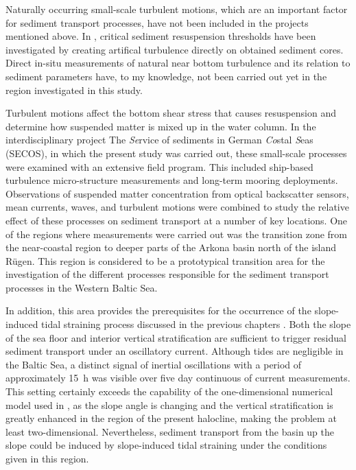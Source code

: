 Naturally occurring small-scale turbulent motions, which are an important 
factor for sediment transport processes, have not been included in the projects 
mentioned above. In \cite{basys1}, critical sediment resuspension thresholds 
have been investigated by creating artifical turbulence directly on 
obtained sediment cores. Direct in-situ measurements of natural near bottom 
turbulence and its relation to sediment parameters have, to my knowledge, not 
been carried out yet in the region investigated in this study. 

Turbulent motions affect the bottom 
shear stress that causes resuspension and determine how 
suspended matter is mixed up in the water column. In the interdisciplinary 
project The \textit{Se}rvice of sediments in German \textit{Co}stal 
\textit{S}eas (SECOS), in which the present study was carried out, these 
small-scale processes were examined with an extensive field program. This 
included ship-based turbulence micro-structure measurements and long-term 
mooring 
deployments. Observations of suspended matter concentration 
from optical backscatter sensors, mean currents, waves, and turbulent 
motions were combined to study the relative effect of these processes on 
sediment transport at a number of key locations. One of the regions where 
measurements were carried out was the 
transition zone from the near-coastal region to deeper parts of the Arkona 
basin north of the island 
R\"{u}gen. This region is considered to be a prototypical transition area for 
the 
investigation of the different processes responsible for the sediment transport 
processes in the Western Baltic Sea. 
 
In addition, this area provides the prerequisites for the occurrence of 
the slope-induced tidal straining process discussed in the previous chapters 
\citep[][]{UmlaufBurchard2011a, 
schulzumlauf2016}. Both the slope of the sea floor and 
interior vertical stratification are sufficient to trigger residual sediment 
transport under an oscillatory current. Although tides are negligible in the 
Baltic Sea, a distinct signal of inertial oscillations with a 
period of approximately 15~h was visible over five day continuous of
current measurements. This setting certainly exceeds the capability of the 
one-dimensional numerical model used in \cite{schulzumlauf2016}, as the slope 
angle is changing and the vertical stratification is greatly enhanced in the 
region of the present halocline, making the problem at least two-dimensional. 
Nevertheless, sediment transport from the basin up the slope could be induced 
by slope-induced tidal straining under the conditions given in this region.
 
